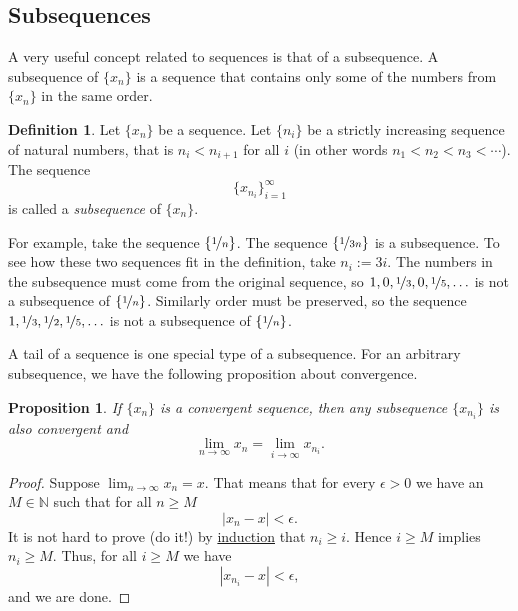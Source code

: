\documentclass[12pt]{book}
\newcommand{\abs}[1]{\left\lvert {#1} \right\rvert}
\newcommand{\N}{{\mathbb{N}}}
\newcommand{\myindex}[1]{#1\index{#1}}
\theoremstyle{plain}
\newtheorem{prop}[thm]{Proposition}
\theoremstyle{remark}
\theoremstyle{definition}
\newtheorem{defn}[thm]{Definition}
\theoremstyle{exercise}
\theoremstyle{example}
\begin{document}
\subsection{Subsequences}

A very useful concept related to sequences is that of a subsequence.
A subsequence of $\{ x_n \}$ is a sequence that contains
only some of the numbers from $\{ x_n \}$ in the same order.

\begin{defn}
Let $\{ x_n \}$ be a sequence.
Let $\{ n_i \}$ be a strictly increasing sequence of natural
numbers, that is $n_i < n_{i+1}$ for all $i$ (in other words $n_1 < n_2 < n_3 < \cdots$).  
The sequence
\begin{equation*}
\{ x_{n_i} \}_{i=1}^\infty
\end{equation*}
is called 
a \emph{\myindex{subsequence}} of $\{ x_n \}$.
\end{defn}

For example, take the sequence $\{ \nicefrac{1}{n} \}$.  The sequence
$\{ \nicefrac{1}{3n} \}$ is a subsequence.  To see how these two
sequences fit in the definition, take $n_i := 3i$.  
The numbers in the
subsequence must come from the original sequence, so $1,0,\nicefrac{1}{3},0,
\nicefrac{1}{5},\ldots$
is not a subsequence of $\{ \nicefrac{1}{n} \}$.  Similarly order
must be preserved, so
the sequence $1,\nicefrac{1}{3},\nicefrac{1}{2},\nicefrac{1}{5},\ldots$
is not a subsequence of $\{ \nicefrac{1}{n} \}$.

A tail of a sequence is one special type of a subsequence.  For an arbitrary
subsequence, we have the following proposition about convergence.

\begin{prop} \label{prop:seqtosubseq}
If $\{ x_n \}$ is a convergent sequence,
then any subsequence $\{ x_{n_i} \}$ is also convergent and
\begin{equation*}
\lim_{n\to \infty} x_n = 
\lim_{i\to \infty} x_{n_i} .
\end{equation*}
\end{prop}

\begin{proof}
Suppose $\lim_{n\to \infty} x_n = x$.  That means that for every
$\epsilon > 0$ we have an $M \in \N$ such that for all $n \geq M$
\begin{equation*}
\abs{x_n - x} < \epsilon .
\end{equation*}
It is not hard to prove (do it!) by \hyperref[induction:thm]{induction} that
$n_i \geq i$.  Hence $i \geq M$ implies $n_i \geq M$.  Thus,
for all $i \geq M$ we have
\begin{equation*}
\abs{x_{n_i} - x} < \epsilon ,
\end{equation*}
and we are done.
\end{proof}
\end{document}
